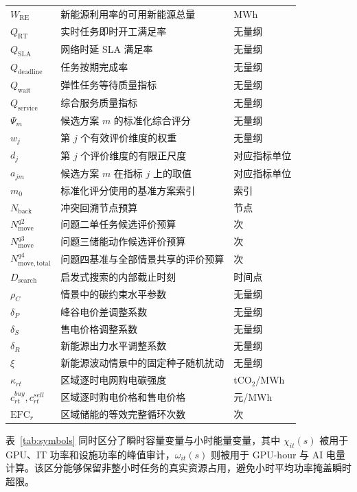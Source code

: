 \documentclass[withoutpreface,bwprint]{cumcmthesis}
\begin{document}
\begin{longtable}{lll}
$W_{\mathrm{RE}}$ & 新能源利用率的可用新能源总量 & MWh \\
$Q_{\mathrm{RT}}$ & 实时任务即时开工满足率 & 无量纲 \\
$Q_{\mathrm{SLA}}$ & 网络时延 SLA 满足率 & 无量纲 \\
$Q_{\mathrm{deadline}}$ & 任务按期完成率 & 无量纲 \\
$Q_{\mathrm{wait}}$ & 弹性任务等待质量指标 & 无量纲 \\
$Q_{\mathrm{service}}$ & 综合服务质量指标 & 无量纲 \\
$\Psi_m$ & 候选方案 $m$ 的标准化综合评分 & 无量纲 \\
$w_j$ & 第 $j$ 个有效评价维度的权重 & 无量纲 \\
$d_j$ & 第 $j$ 个评价维度的有限正尺度 & 对应指标单位 \\
$a_{jm}$ & 候选方案 $m$ 在指标 $j$ 上的取值 & 对应指标单位 \\
$m_0$ & 标准化评分使用的基准方案索引 & 索引 \\
$N_{\mathrm{back}}$ & 冲突回溯节点预算 & 节点 \\
$N_{\mathrm{move}}^{q2}$ & 问题二单任务候选评价预算 & 次 \\
$N_{\mathrm{move}}^{q3}$ & 问题三储能动作候选评价预算 & 次 \\
$N_{\mathrm{move,total}}^{q4}$ & 问题四基准与全部情景共享的评价预算 & 次 \\
$D_{\mathrm{search}}$ & 启发式搜索的内部截止时刻 & 时间点 \\
$\rho_C$ & 情景中的碳约束水平参数 & 无量纲 \\
$\delta_P$ & 峰谷电价差调整系数 & 无量纲 \\
$\delta_S$ & 售电价格调整系数 & 无量纲 \\
$\delta_R$ & 新能源出力水平调整系数 & 无量纲 \\
$\xi$ & 新能源波动情景中的固定种子随机扰动 & 无量纲 \\
$\kappa_{rt}$ & 区域逐时电网购电碳强度 & tCO$_2$/MWh \\
$c_{rt}^{buy},c_{rt}^{sell}$ & 区域逐时购电价格和售电价格 & 元/MWh \\
$\mathrm{EFC}_r$ & 区域储能的等效完整循环次数 & 次 \\
\end{longtable}
\normalsize

表~\ref{tab:symbols} 同时区分了瞬时容量变量与小时能量变量，其中 $\chi_{it}(s)$ 被用于 GPU、IT 功率和设施功率的峰值审计，$\omega_{it}(s)$ 则被用于 GPU-hour 与 AI 电量计算。该区分能够保留非整小时任务的真实资源占用，避免小时平均功率掩盖瞬时超限。
\end{document}
